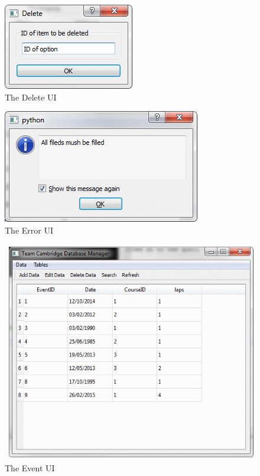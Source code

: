 \begin{figure}
\includegraphics[width=\textwidth]{./Maintenance/UI/Delete.png}
\caption{The Delete UI} \label{fig:Delete_UI}
\end{figure}

\begin{figure}
\includegraphics[width=\textwidth]{./Maintenance/UI/Error.png}
\caption{The Error UI} \label{fig:Error_UI}
\end{figure}

\begin{figure}
\includegraphics[width=\textwidth]{./Maintenance/UI/Event.png}
\caption{The Event UI} \label{fig:Event_UI}
\end{figure}


